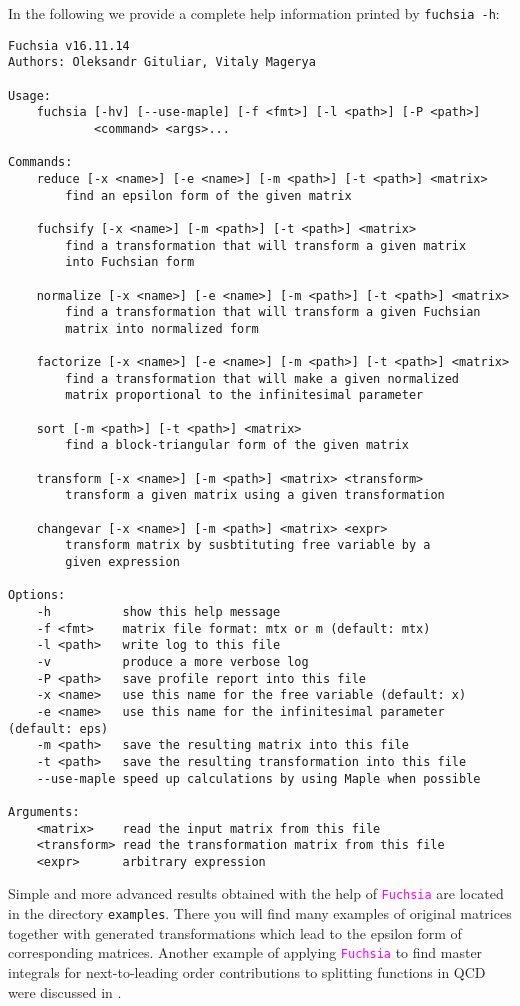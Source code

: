 \documentclass{elsarticle}
\newcommand{\fuchsia}{\textcolor{fuchsia}{\texttt{Fuchsia}}\xspace}
\newcommand{\code}[1]{\texttt{#1}}
\begin{document}
In the following we provide a complete help information printed by \code{fuchsia~-h}:
\begin{Verbatim}
Fuchsia v16.11.14
Authors: Oleksandr Gituliar, Vitaly Magerya

Usage:
    fuchsia [-hv] [--use-maple] [-f <fmt>] [-l <path>] [-P <path>]
            <command> <args>...

Commands:
    reduce [-x <name>] [-e <name>] [-m <path>] [-t <path>] <matrix>
        find an epsilon form of the given matrix

    fuchsify [-x <name>] [-m <path>] [-t <path>] <matrix>
        find a transformation that will transform a given matrix
        into Fuchsian form

    normalize [-x <name>] [-e <name>] [-m <path>] [-t <path>] <matrix>
        find a transformation that will transform a given Fuchsian
        matrix into normalized form

    factorize [-x <name>] [-e <name>] [-m <path>] [-t <path>] <matrix>
        find a transformation that will make a given normalized
        matrix proportional to the infinitesimal parameter

    sort [-m <path>] [-t <path>] <matrix>
        find a block-triangular form of the given matrix

    transform [-x <name>] [-m <path>] <matrix> <transform>
        transform a given matrix using a given transformation

    changevar [-x <name>] [-m <path>] <matrix> <expr>
        transform matrix by susbtituting free variable by a
        given expression

Options:
    -h          show this help message
    -f <fmt>    matrix file format: mtx or m (default: mtx)
    -l <path>   write log to this file
    -v          produce a more verbose log
    -P <path>   save profile report into this file
    -x <name>   use this name for the free variable (default: x)
    -e <name>   use this name for the infinitesimal parameter (default: eps)
    -m <path>   save the resulting matrix into this file
    -t <path>   save the resulting transformation into this file
    --use-maple speed up calculations by using Maple when possible

Arguments:
    <matrix>    read the input matrix from this file
    <transform> read the transformation matrix from this file
    <expr>      arbitrary expression
\end{Verbatim}

Simple and more advanced results obtained with the help of \fuchsia are located in the directory \code{examples}.
There you will find many examples of original matrices together with generated transformations which lead to the epsilon form of corresponding matrices.
Another example of applying \fuchsia to find master integrals for next-to-leading order contributions to splitting functions in QCD were discussed in \cite{GM16}.
\end{document}
